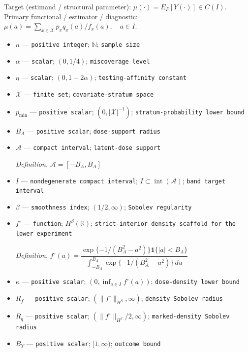 \documentclass{article}
\begin{document}
Target (estimand / structural parameter): \(\mu(\cdot)=E_P[Y(\cdot)]\in C(I)\).
Primary functional / estimator / diagnostic: \(\mu(a)=\sum_{x\in\mathcal X}p_xq_x(a)/f_x(a),\quad a\in I\).
\begin{itemize}
  \item \(n\) --- \texttt{positive integer}; \(\mathbb N\); \texttt{sample size}
  \item \(\alpha\) --- \texttt{scalar}; \((0,1/4)\); \texttt{miscoverage level}
  \item \(\eta\) --- \texttt{scalar}; \((0,1-2\alpha)\); \texttt{testing-\allowbreak{}affinity constant}
  \item \(\mathcal X\) --- \texttt{finite set}; \texttt{covariate-\allowbreak{}stratum space}
  \item \(p_{\min}\) --- \texttt{positive scalar}; \((0,|\mathcal X|^{-1})\); \texttt{stratum-\allowbreak{}probability lower bound}
  \item \(B_A\) --- \texttt{positive scalar}; \texttt{dose-\allowbreak{}support radius}
  \item \(\mathcal A\) --- \texttt{compact interval}; \texttt{latent-\allowbreak{}dose support}
  \par\smallskip\noindent\emph{Definition.} \(\mathcal A=[-B_A,B_A]\)
  \item \(I\) --- \texttt{nondegenerate compact interval}; \(I\subset\operatorname{int}(\mathcal A)\); \texttt{band target interval}
  \item \(\beta\) --- \texttt{smoothness index}; \((1/2,\infty)\); \texttt{Sobolev regularity}
  \item \(f^{\circ}\) --- \texttt{function}; \(H^{\beta}(\mathbb R)\); \texttt{strict-\allowbreak{}interior density scaffold for the lower experiment}
  \par\smallskip\noindent\emph{Definition.} \(f^{\circ}(a)=\dfrac{\exp\{-1/(B_A^2-a^2)\}\mathbf 1\{|a|<B_A\}}{\int_{-B_A}^{B_A}\exp\{-1/(B_A^2-u^2)\}\,du}\)
  \item \(\kappa\) --- \texttt{positive scalar}; \((0,\inf_{a\in I}f^{\circ}(a))\); \texttt{dose-\allowbreak{}density lower bound}
  \item \(R_f\) --- \texttt{positive scalar}; \((\|f^{\circ}\|_{H^{\beta}},\infty)\); \texttt{density Sobolev radius}
  \item \(R_q\) --- \texttt{positive scalar}; \((\|f^{\circ}\|_{H^{\beta}}/2,\infty)\); \texttt{marked-\allowbreak{}density Sobolev radius}
  \item \(B_Y\) --- \texttt{positive scalar}; \([1,\infty)\); \texttt{outcome bound}

\end{itemize}
\end{document}
